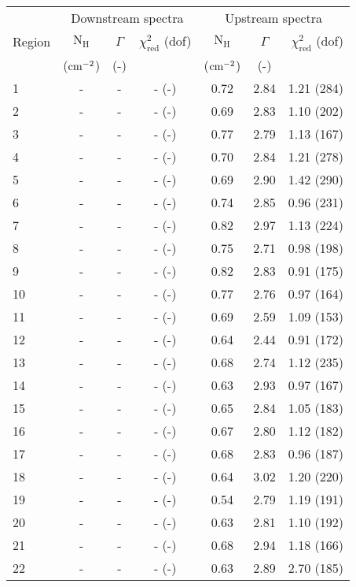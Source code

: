 \begin{tabular}{@{}lcccccr@{}}
\toprule
{} & \multicolumn{3}{c}{Downstream spectra}
   & \multicolumn{3}{c}{Upstream spectra} \\
\cmidrule(lr){2-4} \cmidrule(l){5-7}
Region & $\mathrm{N_H}$ & $\Gamma$ & $\chi^2_{\mathrm{red}}$ (dof)
       & $\mathrm{N_H}$ & $\Gamma$ & $\chi^2_{\mathrm{red}}$ (dof) \\
{} & ($\mathrm{cm}^{-2}$) & (-) & {}
   & ($\mathrm{cm}^{-2}$) & (-) & {} \\
\midrule
1  & - & - & - (-) & 0.72 & 2.84 & 1.21 (284) \\
2  & - & - & - (-) & 0.69 & 2.83 & 1.10 (202) \\
3  & - & - & - (-) & 0.77 & 2.79 & 1.13 (167) \\
4  & - & - & - (-) & 0.70 & 2.84 & 1.21 (278) \\
5  & - & - & - (-) & 0.69 & 2.90 & 1.42 (290) \\
6  & - & - & - (-) & 0.74 & 2.85 & 0.96 (231) \\
7  & - & - & - (-) & 0.82 & 2.97 & 1.13 (224) \\
8  & - & - & - (-) & 0.75 & 2.71 & 0.98 (198) \\
9  & - & - & - (-) & 0.82 & 2.83 & 0.91 (175) \\
10 & - & - & - (-) & 0.77 & 2.76 & 0.97 (164) \\
11 & - & - & - (-) & 0.69 & 2.59 & 1.09 (153) \\
12 & - & - & - (-) & 0.64 & 2.44 & 0.91 (172) \\
13 & - & - & - (-) & 0.68 & 2.74 & 1.12 (235) \\
14 & - & - & - (-) & 0.63 & 2.93 & 0.97 (167) \\
15 & - & - & - (-) & 0.65 & 2.84 & 1.05 (183) \\
16 & - & - & - (-) & 0.67 & 2.80 & 1.12 (182) \\
17 & - & - & - (-) & 0.68 & 2.83 & 0.96 (187) \\
18 & - & - & - (-) & 0.64 & 3.02 & 1.20 (220) \\
19 & - & - & - (-) & 0.54 & 2.79 & 1.19 (191) \\
20 & - & - & - (-) & 0.63 & 2.81 & 1.10 (192) \\
21 & - & - & - (-) & 0.68 & 2.94 & 1.18 (166) \\
22 & - & - & - (-) & 0.63 & 2.89 & 2.70 (185) \\
\bottomrule
\end{tabular}
